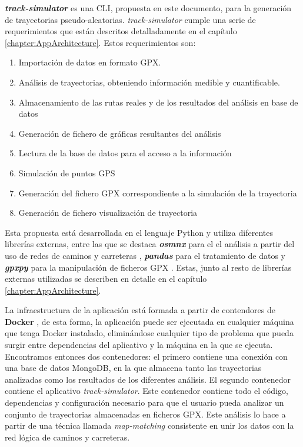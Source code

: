 \textbf{\textit{track-simulator}} es una \ac{CLI}, propuesta en este documento, para la 
generación de trayectorias pseudo-aleatorias. \textit{track-simulator} cumple una serie 
de requerimientos que están descritos detalladamente en el capítulo 
\ref{chapter:AppArchitecture}. Estos requerimientos son:
\begin{enumerate}

\item Importación de datos en formato \ac{GPX}.

\item Análisis de trayectorias, obteniendo información medible y cuantificable.

\item Almacenamiento de las rutas reales y de los resultados del análisis en base de 
datos

\item Generación de fichero de gráficas resultantes del análisis 

\item Lectura de la base de datos para el acceso a la información

\item Simulación de puntos \ac{GPS}

\item Generación del fichero GPX correspondiente a la simulación de la trayectoria

\item Generación de fichero visualización de trayectoria

\end{enumerate} 

Esta propuesta está desarrollada en el lenguaje Python y utiliza diferentes librerías 
externas, entre las que se destaca \textbf{\textit{osmnx}} para el el análisis a partir del 
uso de redes de caminos y carreteras \cite{Boeing01}, \textbf{\textit{pandas}} para el 
tratamiento de datos \cite{Pandas01} y \textbf{\textit{gpxpy}} para la manipulación de 
ficheros \ac{GPX} \cite{Gpxpy01}. Estas, junto al resto de librerías externas utilizadas 
se describen en detalle en el capítulo \ref{chapter:AppArchitecture}.

La infraestructura de la aplicación está formada a partir de contendores de 
\textbf{Docker} \cite{Docker01}, de esta forma, la aplicación puede ser ejecutada en 
cualquier máquina que tenga Docker instalado, eliminándose cualquier tipo de 
problema que pueda surgir entre dependencias del aplicativo y la máquina en la que se 
ejecuta. Encontramos entonces dos contenedores: el primero contiene una conexión 
con una base de datos MongoDB, en la que almacena tanto las trayectorias analizadas 
como los resultados de los diferentes análisis. El segundo contenedor contiene el 
aplicativo \textit{track-simulator}. Este contenedor contiene todo el código, 
dependencias y configuración necesario para que el usuario pueda analizar un conjunto 
de trayectorias almacenadas en ficheros  \ac{GPX}. Este análisis lo hace a partir de una 
técnica llamada \textit{map-matching} consistente en unir los datos con la red lógica 
de caminos y carreteras.

